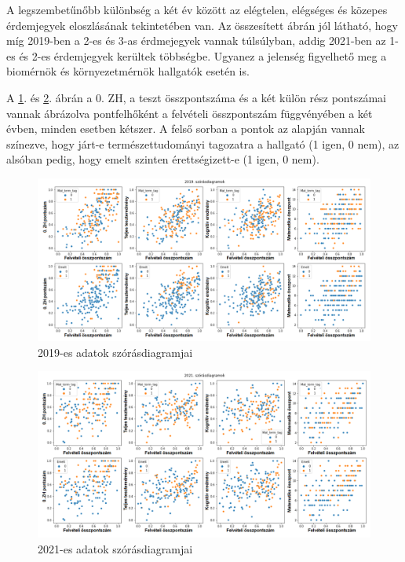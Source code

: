 \documentclass[12pt]{article}
\begin{document}
\noindent A legszembetűnőbb különbség a két év között az elégtelen, elégséges és közepes érdemjegyek eloszlásának tekintetében van. Az összesített ábrán jól látható, hogy míg 2019-ben a 2-es és 3-as érdmejegyek vannak túlsúlyban, addig 2021-ben az 1-es és 2-es érdemjegyek kerültek többségbe. Ugyanez a jelenség figyelhető meg a biomérnök és környezetmérnök hallgatók esetén is.

A \ref{fig:2019scatter}. és \ref{fig:2021scatter}. ábrán a 0. ZH, a teszt összpontszáma és a két külön rész pontszámai vannak ábrázolva pontfelhőként a felvételi összpontszám függvényében a két évben, minden esetben kétszer. A felső sorban a pontok az alapján vannak színezve, hogy járt-e természettudományi tagozatra a hallgató (1 igen, 0 nem), az alsóban pedig, hogy emelt szinten érettségizett-e (1 igen, 0 nem).

\begin{figure}[H]
\centering
\includegraphics[width=\textwidth]{kepek/2019scatter.png}
\caption{2019-es adatok szórásdiagramjai}
\label{fig:2019scatter}
\end{figure}

\begin{figure}[H]
\centering
\includegraphics[width=\textwidth]{kepek/2021scatter.png}
\caption{2021-es adatok szórásdiagramjai}
\label{fig:2021scatter}
\end{figure}
\end{document}
